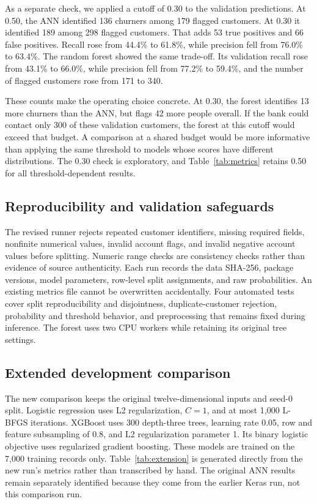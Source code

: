 \documentclass[11pt]{article}
\begin{document}
As a separate check, we applied a cutoff of 0.30 to the validation predictions. At 0.50, the ANN identified 136 churners among 179 flagged customers. At 0.30 it identified 189 among 298 flagged customers. That adds 53 true positives and 66 false positives. Recall rose from 44.4\% to 61.8\%, while precision fell from 76.0\% to 63.4\%. The random forest showed the same trade-off. Its validation recall rose from 43.1\% to 66.0\%, while precision fell from 77.2\% to 59.4\%, and the number of flagged customers rose from 171 to 340.

These counts make the operating choice concrete. At 0.30, the forest identifies 13 more churners than the ANN, but flags 42 more people overall. If the bank could contact only 300 of these validation customers, the forest at this cutoff would exceed that budget. A comparison at a shared budget would be more informative than applying the same threshold to models whose scores have different distributions. The 0.30 check is exploratory, and Table~\ref{tab:metrics} retains 0.50 for all threshold-dependent results.


\subsection{Reproducibility and validation safeguards}

The revised runner rejects repeated customer identifiers, missing required fields, nonfinite numerical values, invalid account flags, and invalid negative account values before splitting. Numeric range checks are consistency checks rather than evidence of source authenticity. Each run records the data SHA-256, package versions, model parameters, row-level split assignments, and raw probabilities. An existing metrics file cannot be overwritten accidentally. Four automated tests cover split reproducibility and disjointness, duplicate-customer rejection, probability and threshold behavior, and preprocessing that remains fixed during inference. The forest uses two CPU workers while retaining its original tree settings.

\subsection{Extended development comparison}

The new comparison keeps the original twelve-dimensional inputs and seed-0 split. Logistic regression uses L2 regularization, $C=1$, and at most 1,000 L-BFGS iterations. XGBoost uses 300 depth-three trees, learning rate 0.05, row and feature subsampling of 0.8, and L2 regularization parameter 1. Its binary logistic objective uses regularized gradient boosting. These models are trained on the 7,000 training records only. Table~\ref{tab:extension} is generated directly from the new run's metrics rather than transcribed by hand. The original ANN results remain separately identified because they come from the earlier Keras run, not this comparison run.
\end{document}
